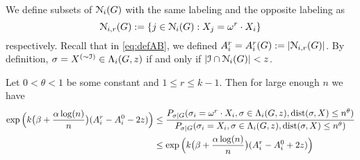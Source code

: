 \documentclass{article}
\begin{document}
We define subsets of $\mathcal{N}_i(G)$ with the same labeling and the opposite labeling as
$$
\mathcal{N}_{i,r}(G):=\{j\in \mathcal{N}_i(G): X_j=\omega^r \cdot X_i \}
$$
respectively.
Recall that in \eqref{eq:defAB}, we defined $A^r_i=A^r_i(G):=|\mathcal{N}_{i,r}(G)|$.
By definition, $\sigma = X^{(\sim\mathcal{I})}\in  \Lambda_i(G,z)$ if and only if $|\mathcal{I}\cap \mathcal{N}_i(G)| < z$.


\begin{lemma} \label{lm:et}
	Let $0<\theta<1$ be some constant and $1\leq r \leq k-1$. Then for large enough $n$ we have
	\begin{align*}
	\exp\Big(k\big(\beta+\frac{\alpha\log(n)}{n} \big) (A^r_i-A^0_i - 2z) \Big) & \le 
	\frac{P_{\sigma|G}(\sigma_i= \omega^r \cdot X_i, \sigma\in \Lambda_i(G,z) ,\operatorname{dist}(\sigma, X) \le n^{\theta} ) } 
	{ P_{\sigma|G}(\sigma_i=X_i, \sigma\in \Lambda_i(G,z) ,\operatorname{dist}(\sigma, X) \le n^{\theta} ) } \\
	& \le \exp\Big(k\big(\beta+\frac{\alpha\log(n)}{n} \big) (A^r_i-A^0_i + 2z) \Big)
	\end{align*}
\end{lemma}
\end{document}
